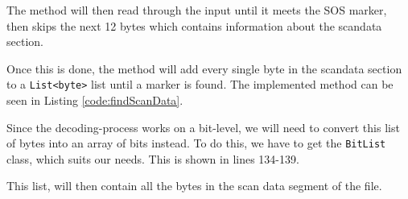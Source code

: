 The method will then read through the input until it meets the SOS marker, then skips the next 12 bytes which contains information about the scandata section.

Once this is done, the method will add every single byte in the scandata section to a \lstinline|List<byte>| list until a marker is found. The implemented method can be seen in Listing \ref{code:findScanData}.

Since the decoding-process works on a bit-level, we will need to convert this list of bytes into an array of bits instead. To do this, we have to get the \lstinline|BitList| class, which suits our needs. This is shown in lines 134-139.

This list, will then contain all the bytes in the scan data segment of the file.
